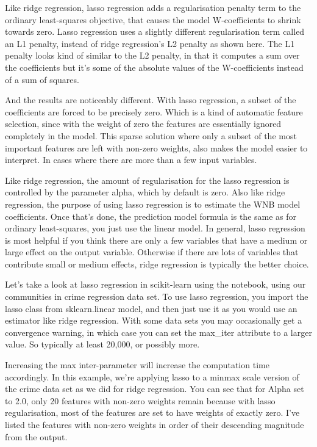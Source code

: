 \begin{multicols}{2}
Like ridge regression, lasso regression adds a regularisation penalty term to the ordinary least-squares objective, that causes the model W-coefficients to shrink towards zero. Lasso regression uses a slightly different regularisation term called an L1 penalty, instead of ridge regression's L2 penalty as shown here. The L1 penalty looks kind of similar to the L2 penalty, in that it computes a sum over the coefficients but it's some of the absolute values of the W-coefficients instead of a sum of squares. 

And the results are noticeably different. With lasso regression, a subset of the coefficients are forced to be precisely zero. Which is a kind of automatic feature selection, since with the weight of zero the features are essentially ignored completely in the model. This sparse solution where only a subset of the most important features are left with non-zero weights, also makes the model easier to interpret. In cases where there are more than a few input variables. 

Like ridge regression, the amount of regularisation for the lasso regression is controlled by the parameter alpha, which by default is zero. Also like ridge regression, the purpose of using lasso regression is to estimate the WNB model coefficients. Once that's done, the prediction model formula is the same as for ordinary least-squares, you just use the linear model. In general, lasso regression is most helpful if you think there are only a few variables that have a medium or large effect on the output variable. Otherwise if there are lots of variables that contribute small or medium effects, ridge regression is typically the better choice. 

Let's take a look at lasso regression in scikit-learn using the notebook, using our communities in crime regression data set. To use lasso regression, you import the lasso class from sklearn.linear model, and then just use it as you would use an estimator like ridge regression. With some data sets you may occasionally get a convergence warning, in which case you can set the max_iter attribute to a larger value. So typically at least 20,000, or possibly more. 

Increasing the max inter-parameter will increase the computation time accordingly. In this example, we're applying lasso to a minmax scale version of the crime data set as we did for ridge regression. You can see that for Alpha set to 2.0, only 20 features with non-zero weights remain because with lasso regularisation, most of the features are set to have weights of exactly zero. I've listed the features with non-zero weights in order of their descending magnitude from the output. 


\end{multicols}
